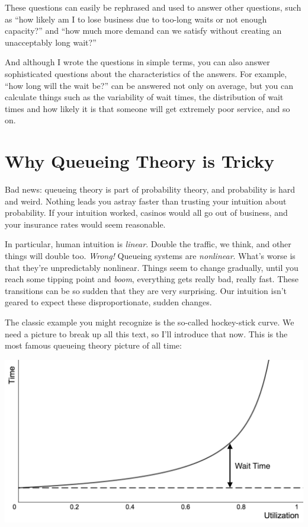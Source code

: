 \documentclass{vivid_layout}
\begin{document}
These questions can easily be rephrased and used to answer other questions, such as ``how likely am I to lose business due to too-long waits or not enough capacity?'' and ``how much more demand can we satisfy without creating an unacceptably long wait?''

And although I wrote the questions in simple terms, you can also answer sophisticated questions about the characteristics of the answers. For example, ``how long will the wait be?'' can be answered not only on average, but you can calculate things such as the variability of wait times, the distribution of wait times and how likely it is that someone will get extremely poor service, and so on.

\section{Why Queueing Theory is Tricky}

Bad news: queueing theory is part of probability theory, and probability is hard and weird. Nothing leads you astray faster than trusting your intuition about probability. If your intuition worked, casinos would all go out of business, and your insurance rates would seem reasonable.

In particular, human intuition is {\itshape linear}. Double the traffic, we think, and other things will double too. {\itshape Wrong!} Queueing systems are {\itshape nonlinear}. What's worse is that they're unpredictably nonlinear. Things seem to change gradually, until you reach some tipping point and {\itshape boom}, everything gets really bad, really fast. These transitions can be so sudden that they are very surprising. Our intuition isn't geared to expect these disproportionate, sudden changes.

The classic example you might recognize is the so-called hockey-stick curve. We need a picture to break up all this text, so I'll introduce that now. This is the most famous queueing theory picture of all time:

\begin{center}
\includegraphics[width=.75\linewidth]{queueing-theory/hockey-stick-1}
\end{center}
\end{document}
